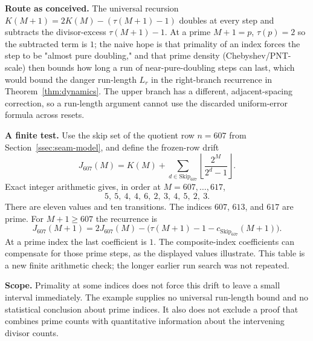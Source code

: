 \begin{obs}
\label{obs:prime-doubling}
\textbf{Route as conceived.} The universal recursion $K(M+1) = 2K(M) - (\tau(M+1)-1)$ doubles at every step and subtracts the divisor-excess $\tau(M+1)-1$. At a prime $M+1=p$,
$\tau(p)=2$ so the subtracted term is $1$; the naive hope is that primality of an index forces the
step to be "almost pure doubling," and that prime density (Chebyshev/PNT-scale) then bounds how
long a run of near-pure-doubling steps can last, which would bound the danger run-length $L_r$ in
the right-branch recurrence in Theorem~\ref{thm:dynamics}.
The upper branch has a different, adjacent-spacing correction, so
a run-length argument cannot use the discarded uniform-error
formula across resets.

\textbf{A finite test.} Use the skip set of the quotient row $n=607$
from Section~\ref{ssec:seam-model}, and define the frozen-row drift
\[
 J_{607}(M)=K(M)+\sum_{d\in\mathrm{Skip}_{607}}
                   \left\lfloor\frac{2^M}{2^d-1}\right\rfloor.
\]
Exact integer arithmetic gives, in order at $M=607,\ldots,617$,
\[
 5,\ 5,\ 4,\ 4,\ 6,\ 2,\ 3,\ 4,\ 5,\ 2,\ 3.
\]
There are eleven values and ten transitions.  The indices $607$, $613$,
and $617$ are prime.  For $M+1\ge607$ the recurrence is
\[
 J_{607}(M+1)=2J_{607}(M)
 -\bigl(\tau(M+1)-1-c_{\mathrm{Skip}_{607}}(M+1)\bigr).
\]
At a prime index the last coefficient is $1$.  The composite-index
coefficients can compensate for those prime steps, as the displayed
values illustrate.  This table is a new finite arithmetic check; the
longer earlier run search was not repeated.

\textbf{Scope.} Primality at some indices does not force this drift to
leave a small interval immediately.  The example supplies no universal
run-length bound and no statistical conclusion about prime indices.
It also does not exclude a proof that combines prime counts with
quantitative information about the intervening divisor counts.
\end{obs}


